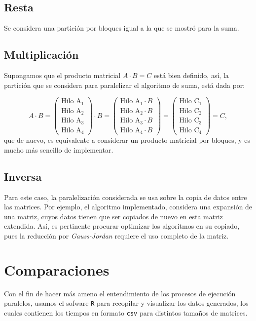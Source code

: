 \documentclass{article}\usepackage[]{graphicx}\usepackage[]{color}
\begin{document}
\subsection*{Resta}
Se considera una partición por bloques igual a la que se mostró para la suma.
\subsection*{Multiplicación}
Supongamos que el producto matricial $A\cdot B = C$ está bien definido, así, la partición que se considera para paralelizar el algoritmo de suma, está dada por:

\begin{equation*}
	A\cdot B =
	\begin{pmatrix}
		\text{Hilo A}_1\\ 
		\text{Hilo A}_2\\
		\text{Hilo A}_3\\
		\text{Hilo A}_4
	\end{pmatrix}\cdot B = 
	\begin{pmatrix}
	\text{Hilo A}_1\cdot B\\ 
	\text{Hilo A}_2\cdot B\\
	\text{Hilo A}_3\cdot B\\
	\text{Hilo A}_4\cdot B  
	\end{pmatrix}=
	\begin{pmatrix}
		\text{Hilo C}_1\\ 
		\text{Hilo C}_2\\
		\text{Hilo C}_3\\
		\text{Hilo C}_4
	\end{pmatrix} = C,
\end{equation*}
que de nuevo, es equivalente a considerar un producto matricial por bloques, y es mucho más sencillo de implementar.
\subsection*{Inversa}
Para este caso, la paralelización considerada se usa sobre la copia de datos entre las matrices. Por ejemplo, el algoritmo implementado, considera una expansión de una matriz, cuyos datos tienen que ser copiados de nuevo en esta matriz extendida. Así, es pertinente procurar optimizar los algoritmos en su copiado, pues la reducción por \textit{Gauss-Jordan}
requiere el uso completo de la matriz.
\section{Comparaciones}
Con el fin de hacer más ameno el entendimiento de los procesos de ejecución paralelos, usamos el sofware \texttt{R} para recopilar y visualizar los datos generados, los cuales contienen los tiempos en formato \texttt{csv} para distintos tamaños de matrices.
\end{document}
